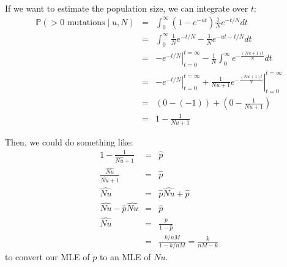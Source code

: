 \documentclass[11pt]{article}
\renewcommand{\Pr}{\mathbb{P}}
\begin{document}
If we want to estimate the population size, we can integrate over $t$:
\begin{eqnarray*}
\Pr(>0 \mbox{ mutations} \mid u, N) & = & \int_0^\infty\left(1 - e^{- ut}\right)\frac{1}{N}e^{-t/N} dt\\
& = & \int_0^\infty\frac{1}{N}e^{-t/N} - \frac{1}{N}e^{- ut-t/N} dt \\
& = & \left.-e^{-t/N}\right|_{t=0}^{t=\infty} - \frac{1}{N}\int_0^\infty e^{-\frac{(Nu + 1)t}{N}} dt \\
& = & \left.-e^{-t/N}\right|_{t=0}^{t=\infty} + \left.\frac{1}{Nu + 1} e^{-\frac{(Nu + 1)t}{N}}\right|_{t=0}^{t=\infty} \\
& = & \left(0 - (-1)\right) + \left(0 - \frac{1}{Nu + 1}\right) \\
& = & 1 - \frac{1}{Nu + 1}
\end{eqnarray*}

Then, we could do something like:
\begin{eqnarray*}
1 - \frac{1}{\widehat{Nu} + 1} & = & \hat{p}\\
\frac{\widehat{Nu}}{\widehat{Nu} + 1} & = & \hat{p}\\
\widehat{Nu} & = & \hat{p}\widehat{Nu} + \hat{p}\\
\widehat{Nu} - \hat{p}\widehat{Nu} & = & \hat{p}\\
\widehat{Nu} & = & \frac{\hat{p}}{1 - \hat{p}} \\
& = & \frac{k/nM}{1 - k/nM} = \frac{k}{nM-k}
\end{eqnarray*}
to convert our MLE of $p$ to an MLE of $Nu$.
\end{document}
